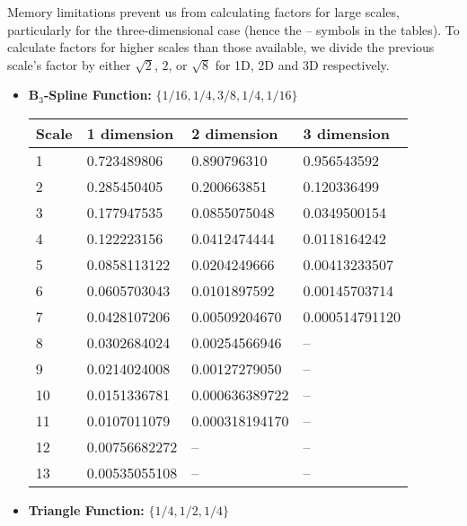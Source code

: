 Memory limitations prevent us from calculating factors for large
scales, particularly for the three-dimensional case (hence the --
symbols in the tables). To calculate factors for higher scales than
those available, we divide the previous scale's factor by either
$\sqrt{2}$, $2$, or $\sqrt{8}$ for 1D, 2D and 3D respectively. 

{\small
\begin{itemize}
\item \textbf{B$_3$-Spline Function:} $\{1/16,1/4,3/8,1/4,1/16\}$

\begin{tabular}{llll}
Scale & 1 dimension      & 2 dimension     & 3 dimension\\ \hline
1     & 0.723489806      & 0.890796310     & 0.956543592\\
2     & 0.285450405	 & 0.200663851	   & 0.120336499\\
3     & 0.177947535	 & 0.0855075048	   & 0.0349500154\\
4     & 0.122223156	 & 0.0412474444	   & 0.0118164242\\
5     & 0.0858113122	 & 0.0204249666	   & 0.00413233507\\
6     & 0.0605703043	 & 0.0101897592	   & 0.00145703714\\
7     & 0.0428107206	 & 0.00509204670   & 0.000514791120\\
8     & 0.0302684024	 & 0.00254566946   & --\\
9     & 0.0214024008	 & 0.00127279050   & --\\
10    & 0.0151336781	 & 0.000636389722  & --\\
11    & 0.0107011079	 & 0.000318194170  & --\\
12    & 0.00756682272	 & --		   & --\\
13    & 0.00535055108	 & --		   & --\\
\end{tabular}

\item \textbf{Triangle Function:} $\{1/4,1/2,1/4\}$


\end{itemize}}
